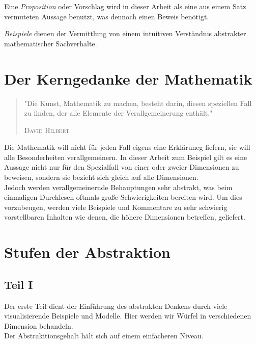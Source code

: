 \theoremstyle{prop}
\begin{prop}{}
Eine \emph{Proposition} oder Vorschlag wird in dieser Arbeit als eine aus einem Satz vermuteten Aussage benutzt, was dennoch einen Beweis benötigt.
\end{prop}

\theoremstyle{example}
\begin{example}
\emph{Beispiele} dienen der Vermittlung von einem intuitiven Verständnis abstrakter mathematischer Sachverhalte.
\end{example}


\section{Der Kerngedanke der Mathematik}
\begin{quote}
"Die Kunst, Mathematik zu machen, besteht darin, diesen speziellen Fall zu finden, der alle Elemente der Verallgemeinerung enthält."
\begin{flushright}
\textsc{David Hilbert}
\end{flushright}
\end{quote}

Die Mathematik will nicht für jeden Fall eigens eine Erkläruneg liefern, sie will alle Besonderheiten verallgemeinern. In dieser Arbeit zum Beispiel gilt es eine Aussage nicht nur für den Spezialfall von einer oder zweier Dimensionen zu beweisen, sondern sie bezieht sich gleich auf alle Dimensionen. 
\\Jedoch werden verallgemeinernde Behauptungen sehr abstrakt, was beim einmaligen Durchlesen oftmals große Schwierigkeiten bereiten wird. Um dies vorzubeugen, werden viele Beispiele und Kommentare zu sehr schwierig vorstellbaren Inhalten wie denen, die höhere Dimensionen betreffen, geliefert.


\section{Stufen der Abstraktion}
\subsection*{Teil I}
Der erste Teil dient der Einführung des abstrakten Denkens durch viele visualisierende Beispiele und Modelle. Hier werden wir Würfel in verschiedenen Dimension behandeln.
\\ Der Abstrakitionsgehalt hält sich auf einem einfacheren Niveau.

